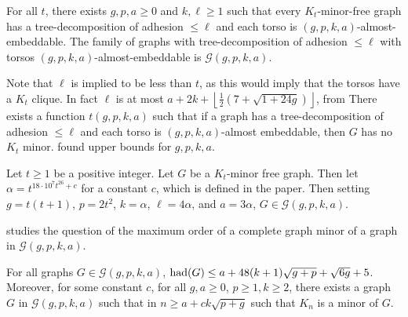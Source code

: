 \begin{theorem}\label{thm:gmst}
	For all \(t\), there exists \(g, p, a \geq 0\) and \(k, \ell \geq 1\) such that every \(K_t\)-minor-free graph has a tree-decomposition of adhesion \(\leq \ell\) and each torso is \((g, p, k, a)\)-almost-embeddable. The  family of graphs with tree-decomposition of adhesion $\leq \ell$ with torsos $(g, p, k, a)$-almost-embeddable is \(\mathcal{G}(g, p, k, a)\). 
\end{theorem}
Note that $\ell$ is implied to be less than $t$, as this would imply that the torsos have a $K_t$ clique. In fact $\ell$ is at most $a + 2k + \left\lfloor 
\frac{1}{2} (7 + \sqrt{1 + 24g})
\right\rfloor$, from 
There exists a function \(t(g, p, k, a)\) such that if a graph has a tree-decomposition of adhesion \(\leq \ell\) and each torso is \((g, p, k, a)\)-almost embeddable, then \(G\) has no \(K_t\) minor. \textcite{kawarabayashiQuicklyExcludingNonplanar2021} found upper bounds for $g, p, k, a$. 

\begin{theorem}
	Let $t \geq 1$ be a positive integer. Let $G$ be a $K_t$-minor free graph. Then let $\alpha = t^{18 \cdot 10^{7} t^{26} + c}$ for a constant $c$, which is defined in the paper. Then setting $g = t(t+1)$, $p = 2t^2$, $k = \alpha$, $\ell = 4\alpha$, and $a = 3\alpha$, $G \in \mathcal{G}(g,p,k,a)$. 
\end{theorem}

\textcite{joretCompleteGraphMinors2013} studies the question of the maximum order of a complete graph minor of a graph in $\mathcal{G}(g, p, k, a)$. 

\begin{theorem}\label{thm:graph_structure_bound_theorem}
	For all graphs \(G \in \mathcal{G}(g, p, k, a)\),
	\(\operatorname{had}(G) \leq a + 48(k + 1)\sqrt{g + p} + \sqrt{6g} + 5\). Moreover, for some constant $c$, for all $g, a \geq 0$, $p \geq 1, k \geq 2$, there exists a graph $G$ in \(\mathcal{G}(g, p, k, a)\) such that in \(n \geq a + c k\sqrt{p + g}\) such that \(K_n\) is a minor of $G$.
\end{theorem}